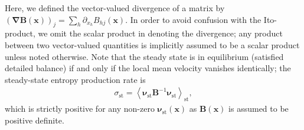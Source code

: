 \documentclass[aps,pre,twocolumn,superscriptaddress,notitlepage]{revtex4-2}
\newcommand{\Av}[1]{\left\langle #1 \right\rangle}
\newcommand{\grad}{\bm{\nabla}}
\begin{document}
Here, we defined the vector-valued divergence of a matrix by $(\grad \bm{B}(\bm{x}))_{j} = \sum_{h} \partial_{x_h} B_{h j}(\bm{x})$.
In order to avoid confusion with the Ito-product, we omit the scalar product in denoting the divergence; any product between two vector-valued quantities is implicitly assumed to be a scalar product unless noted otherwise.
Note that the steady state is in equilibrium (satisfied detailed balance) if and only if the local mean velocity vanishes identically; the steady-state entropy production rate is
\begin{align}
\sigma_\text{st} = \Av{\bm{\nu}_\text{st} \bm{B}^{-1} \bm{\nu}_\text{st}}_\text{st},
\end{align}
which is strictly positive for any non-zero $\bm{\nu}_\text{st}(\bm{x})$ as $\bm{B}(\bm{x})$ is assumed to be positive definite.
\end{document}
